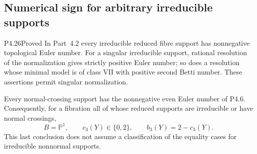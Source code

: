 \subsection{Numerical sign for arbitrary irreducible supports}

\begin{statement}{P4.26}{Proved}
In Part~4.2 every irreducible reduced fibre support
has nonnegative topological Euler number. For a
singular irreducible support, rational resolution
of the normalization gives strictly positive
Euler number; so does a resolution whose minimal
model is of class VII with positive second
Betti number. These assertions permit singular
normalization.

Every normal-crossing support has the
nonnegative even Euler number of P4.6.
Consequently, for a fibration all of whose
reduced supports are irreducible or have
normal crossings,
\[
 B=\mathbb P^1,\qquad c_3(Y)\in\{0,2\},
 \qquad b_3(Y)=2-c_3(Y).
\]
This last conclusion does not assume a
classification of the equality cases for
irreducible nonnormal supports.
\end{statement}
